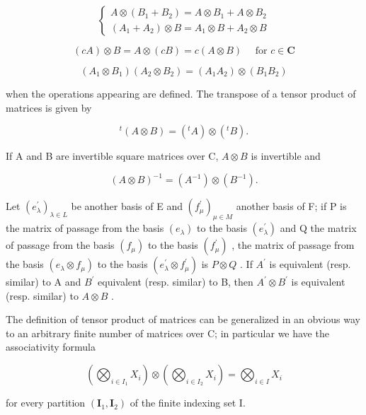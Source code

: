 \[
\left\{ \begin{array}{l} A \otimes (B _ {1} + B _ {2}) = A \otimes B _ {1} + A \otimes B _ {2} \\ (A _ {1} + A _ {2}) \otimes B = A _ {1} \otimes B + A _ {2} \otimes B \end{array} \right.\tag{43}
\]

\[
(c A) \otimes B = A \otimes (c B) = c (A \otimes B) \quad \text { for } c \in \mathbf {C}\tag{44}
\]

\[
(A _ {1} \otimes B _ {1}) (A _ {2} \otimes B _ {2}) = (A _ {1} A _ {2}) \otimes (B _ {1} B _ {2})\tag{45}
\]

when the operations appearing are defined. The transpose of a tensor product of matrices is given by

\[
{ } ^ { t } ( A \otimes B ) = ( { } ^ { t } A ) \otimes ( { } ^ { t } B ) .\tag{46}
\]

If A and B are invertible square matrices over C, \(A \otimes B\) is invertible and

\[
(A \otimes B) ^ {- 1} = (A ^ {- 1}) \otimes (B ^ {- 1}).\tag{47}
\]

Let \((e_{\lambda}^{\prime})_{\lambda \in L}\) be another basis of E and \((f_{\mu}^{\prime})_{\mu \in M}\) another basis of F; if P is the matrix of passage from the basis \((e_{\lambda})\) to the basis \((e_{\lambda}^{\prime})\) and Q the matrix of passage from the basis \((f_{\mu})\) to the basis \((f_{\mu}^{\prime})\) , the matrix of passage from the basis \((e_{\lambda} \otimes f_{\mu})\) to the basis \((e_{\lambda}^{\prime} \otimes f_{\mu}^{\prime})\) is \(P \otimes Q\) . If \(A^{\prime}\) is equivalent (resp. similar) to A and \(B^{\prime}\) equivalent (resp. similar) to B, then \(A^{\prime} \otimes B^{\prime}\) is equivalent (resp. similar) to \(A \otimes B\) .

The definition of tensor product of matrices can be generalized in an obvious way to an arbitrary finite number of matrices over C; in particular we have the associativity formula

\[
\left(\bigotimes_ {i \in I _ {1}} X _ {i}\right) \otimes \left(\bigotimes_ {i \in I _ {2}} X _ {i}\right) = \bigotimes_ {i \in I} X _ {i}\tag{48}
\]

for every partition \((\mathbf{I}_{1}, \mathbf{I}_{2})\) of the finite indexing set I.


